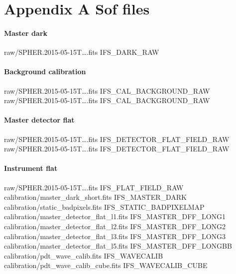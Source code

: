 \documentclass[twoside,single]{lion-msc}
\begin{document}
\chapter*{Appendix A Sof files}

\subsubsection*{Master dark}
\begin{mdframed}[linewidth = 0.2mm, linecolor = black]
raw/SPHER.2015-05-15T\dots.fits IFS\_DARK\_RAW
\end{mdframed}

\subsubsection*{Background calibration}
\begin{mdframed}[linewidth = 0.2mm, linecolor = black]
raw/SPHER.2015-05-15T\dots.fits IFS\_CAL\_BACKGROUND\_RAW\\
raw/SPHER.2015-05-15T\dots.fits IFS\_CAL\_BACKGROUND\_RAW
\end{mdframed}

\subsubsection*{Master detector flat}
\begin{mdframed}[linewidth = 0.2mm, linecolor = black]
raw/SPHER.2015-05-15T\dots.fits IFS\_DETECTOR\_FLAT\_FIELD\_RAW\\
raw/SPHER.2015-05-15T\dots.fits IFS\_DETECTOR\_FLAT\_FIELD\_RAW
\end{mdframed}

\subsubsection*{Instrument flat}
\begin{mdframed}[linewidth = 0.2mm, linecolor = black]
raw/SPHER.2015-05-15T\dots.fits IFS\_FLAT\_FIELD\_RAW\\
calibration/master\_dark\_short.fits IFS\_MASTER\_DARK\\
calibration/static\_badpixels.fits IFS\_STATIC\_BADPIXELMAP\\
calibration/master\_detector\_flat\_l1.fits IFS\_MASTER\_DFF\_LONG1\\
calibration/master\_detector\_flat\_l2.fits IFS\_MASTER\_DFF\_LONG2\\
calibration/master\_detector\_flat\_l3.fits IFS\_MASTER\_DFF\_LONG3\\
calibration/master\_detector\_flat\_l5.fits IFS\_MASTER\_DFF\_LONGBB\\
calibration/pdt\_wave\_calib.fits IFS\_WAVECALIB\\
calibration/pdt\_wave\_calib\_cube.fits IFS\_WAVECALIB\_CUBE
\end{mdframed}
\end{document}
